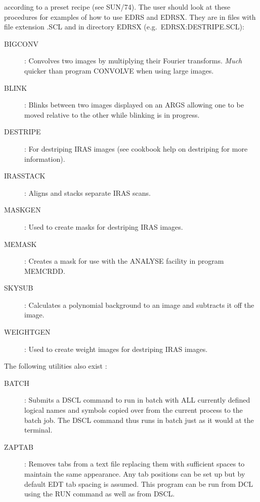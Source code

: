 according to a preset recipe (see SUN/74).
The user should look at these procedures for examples of how to use EDRS and
EDRSX.
They are in files with file extension .SCL and in directory EDRSX (e.g.\
EDRSX:DESTRIPE.SCL):
\begin{description}
\begin{description}
\item [BIGCONV]: Convolves two images by multiplying their Fourier transforms.
{\em Much} quicker than program CONVOLVE when using large images.
\item [BLINK]: Blinks between two images displayed on an ARGS allowing one to
be moved relative to the other while blinking is in progress.
\item [DESTRIPE]: For destriping IRAS images (see cookbook help on destriping
for more information).
\item [IRASSTACK]: Aligns and stacks separate IRAS scans.
\item [MASKGEN]: Used to create masks for destriping IRAS images.
\item [MEMASK]: Creates a mask for use with the ANALYSE facility in program
MEMCRDD.
\item [SKYSUB]: Calculates a polynomial background to an image and subtracts
it off the image.
\item [WEIGHTGEN]: Used to create weight images for destriping IRAS images.
\end{description}
\end{description}
The following utilities also exist :
\begin{description}
\begin{description}
\item[BATCH]: Submits a DSCL command to run in batch with ALL currently defined
logical names and symbols copied over from the current process to the batch job.
The DSCL command thus runs in batch just as it would at the terminal.
\item[ZAPTAB]: Removes tabs from a text file replacing them with sufficient
spaces to maintain the same appearance.
Any tab positions can be set up but by default EDT tab spacing is assumed.
This program can be run from DCL using the RUN command as well as from DSCL.
\end{description}
\end{description}
